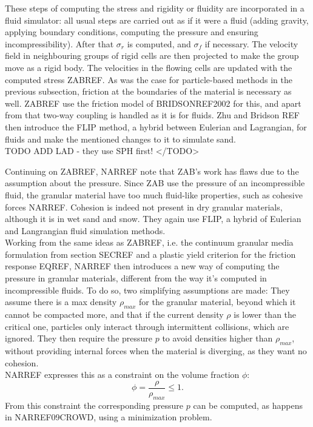 These steps of computing the stress and rigidity or fluidity are incorporated in a fluid simulator: all usual steps are carried out as if it were a fluid (adding gravity, applying boundary conditions, computing the pressure and ensuring incompressibility). After that $\sigma_r$ is computed, and $\sigma_f$ if necessary. The velocity field in neighbouring groups of rigid cells are then projected to make the group move as a rigid body. The velocities in the flowing cells are updated with the computed stress ZABREF. As was the case for particle-based methods in the previous subsection, friction at the boundaries of the material is necessary as well. ZABREF use the friction model of BRIDSONREF2002 for this, and apart from that two-way coupling is handled as it is for fluids. Zhu and Bridson REF then introduce the FLIP method, a hybrid between Eulerian and Lagrangian, for fluids and make the mentioned changes to it to simulate sand.\\

TODO ADD LAD - they use SPH first! </TODO>

Continuing on ZABREF, NARREF note that ZAB's work has flaws due to the assumption about the pressure. Since ZAB use the pressure of an incompressible fluid, the granular material have too much fluid-like properties,  such as cohesive forces NARREF. Cohesion is indeed not present in dry granular materials, although it is in wet sand and snow. They again use FLIP, a hybrid of Eulerian and Langrangian fluid simulation methods.\\

Working from the same ideas as ZABREF, i.e. the continuum granular media formulation from section SECREF and a plastic yield criterion for the friction response EQREF, NARREF then introduces a new way of computing the pressure in granular materials, different from the way it's computed in incompressible fluids. To do so, two simplifying assumptions are made: They assume there is a max density $\rho_{max}$ for the granular material, beyond which it cannot be compacted more, and that if the current density $\rho$ is lower than the critical one, particles only interact through intermittent collisions, which are ignored. They then require the pressure $p$ to avoid densities higher than $\rho_{max}$, without providing internal forces when the material is diverging, as they want no cohesion.\\

NARREF expresses this as a constraint on the volume fraction $\phi$:
\begin{equation}
\phi = \frac{\rho}{\rho_{max}} \leq 1.
\end{equation}
From this constraint the corresponding pressure $p$ can be computed, as happens in NARREF09CROWD, using a minimization problem.\\

